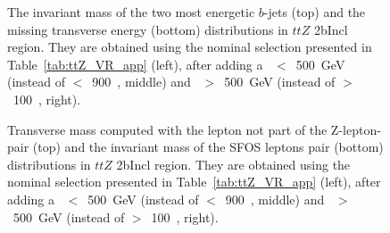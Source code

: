 \begin{figure}[h!]
\centering
{}
\caption{The invariant mass of the two most energetic $b$-jets (top) and the missing transverse energy (bottom) distributions in $ttZ$ 2bIncl region. They are obtained using the nominal selection presented in Table~\ref{tab:ttZ_VR_app} (left), after adding a \meff~$<$~500~GeV (instead of $<$~900~\GeV, middle) and \meff~$>$~500~GeV (instead of $>$~100~\GeV, right).}
\label{fig:Results_VR2bttZ_Mbb_met}
\end{figure}
\begin{figure}[h!]
\centering
{}
\caption{Transverse mass computed with the lepton not part of the Z-lepton-pair (top) and the invariant mass of the SFOS leptons pair (bottom) distributions in $ttZ$ 2bIncl region. They are obtained using the nominal selection presented in Table~\ref{tab:ttZ_VR_app} (left), after adding a \meff~$<$~500~GeV (instead of $<$~900~\GeV, middle) and \meff~$>$~500~GeV (instead of $>$~100~\GeV, right).}
\label{fig:Results_VR2bttZ_more_1}
\end{figure}
